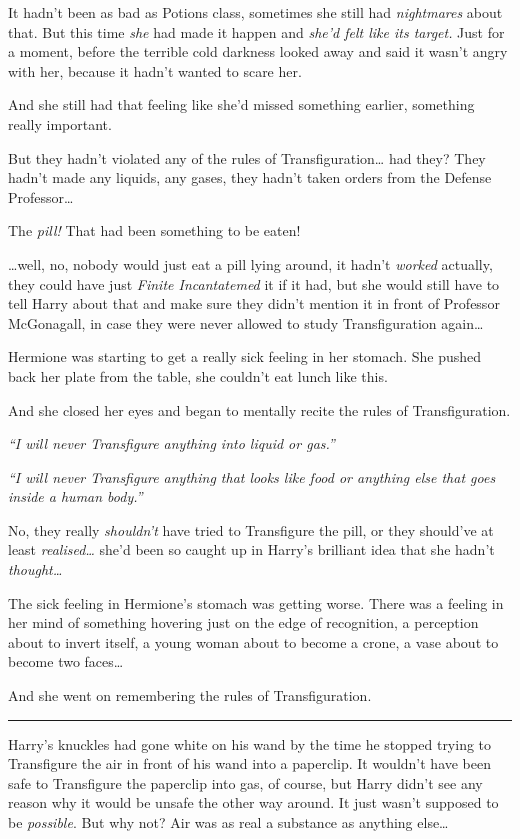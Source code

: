 It hadn't been as bad as Potions class, sometimes she still had
\emph{nightmares} about that. But this time \emph{she} had made it
happen and \emph{she'd felt like its target.} Just for a moment, before
the terrible cold darkness looked away and said it wasn't angry with
her, because it hadn't wanted to scare her.

And she still had that feeling like she'd missed something earlier,
something really important.

But they hadn't violated any of the rules of Transfiguration\ldots{} had
they? They hadn't made any liquids, any gases, they hadn't taken orders
from the Defense Professor\ldots{}

The \emph{pill!} That had been something to be eaten!

\ldots{}well, no, nobody would just eat a pill lying around, it hadn't
\emph{worked} actually, they could have just \emph{Finite Incantatemed}
it if it had, but she would still have to tell Harry about that and make
sure they didn't mention it in front of Professor McGonagall, in case
they were never allowed to study Transfiguration again\ldots{}

Hermione was starting to get a really sick feeling in her stomach. She
pushed back her plate from the table, she couldn't eat lunch like this.

And she closed her eyes and began to mentally recite the rules of
Transfiguration.

\emph{``I will never Transfigure anything into liquid or gas.''}

\emph{``I will never Transfigure anything that looks like food or
anything else that goes inside a human body.''}

No, they really \emph{shouldn't} have tried to Transfigure the pill, or
they should've at least \emph{realised\ldots{}} she'd been so caught up
in Harry's brilliant idea that she hadn't \emph{thought\ldots{}}

The sick feeling in Hermione's stomach was getting worse. There was a
feeling in her mind of something hovering just on the edge of
recognition, a perception about to invert itself, a young woman about to
become a crone, a vase about to become two faces\ldots{}

And she went on remembering the rules of Transfiguration.

\begin{center}\rule{3in}{0.4pt}\end{center}

Harry's knuckles had gone white on his wand by the time he stopped
trying to Transfigure the air in front of his wand into a paperclip. It
wouldn't have been safe to Transfigure the paperclip into gas, of
course, but Harry didn't see any reason why it would be unsafe the other
way around. It just wasn't supposed to be \emph{possible}. But why not?
Air was as real a substance as anything else\ldots{}

